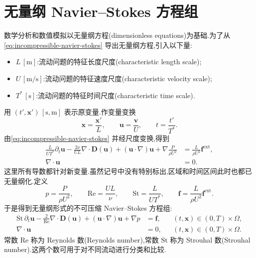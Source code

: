 \section{无量纲 Navier--Stokes 方程组}\label{sec:dimensionless-navier-stokes}
\markright{\thesection}

\begin{note}[特征尺度]\label{note:characteristic-scales}
数学分析和数值模拟以无量纲方程(dimensionless equations)为基础.为了从\cref{eq:incompressible-navier-stokes} 导出无量纲方程,引入以下量:
\begin{itemize}
  \item $L\,[\mathrm{m}]$:流动问题的特征长度尺度(characteristic length scale);
  \item $U\,[\mathrm{m}/\mathrm{s}]$:流动问题的特征速度尺度(characteristic velocity scale);
  \item $T^*\,[\mathrm{s}]$:流动问题的特征时间尺度(characteristic time scale).
\end{itemize}
\end{note}

\begin{note}\label{note:dimensionless-equations}
用 $(t',\bm{x}')\,[\mathrm{s},\mathrm{m}]$ 表示原变量.作变量变换
\begin{equation}\label{eq:dimensionless-variable-transform}
  \bm{x}=\frac{\bm{x}'}{L},\qquad
  \bm{u}=\frac{\bm{v}}{U},\qquad
  t=\frac{t'}{T^*}.
\end{equation}
由\cref{eq:incompressible-navier-stokes} 并经尺度变换,得到
\begin{equation*}
\begin{aligned}
  \frac{L}{UT^*}\partial_t\bm{u}
   -\frac{2\nu}{UL}\nabla\cdot\bm{D}(\bm{u})
   +(\bm{u}\cdot\nabla)\bm{u}
   +\nabla\frac{P}{\rho U^2}
  &=\frac{L}{\rho U^2}\bm{f}^{\mathrm{ext}},\\
  \nabla\cdot\bm{u}&=0.
\end{aligned}
\end{equation*}
这里所有导数都针对新变量.虽然记号中没有特别标出,区域和时间区间此时也都已无量纲化.定义
\begin{equation}\label{eq:dimensionless-parameters}
  p=\frac{P}{\rho U^2},\qquad
  \mathrm{Re}=\frac{UL}{\nu},\qquad
  \mathrm{St}=\frac{L}{UT^*},\qquad
  \bm{f}=\frac{L}{\rho U^2}\bm{f}^{\mathrm{ext}}.
\end{equation}
于是得到无量纲形式的不可压缩 Navier--Stokes 方程组:
\begin{equation}\label{eq:dimensionless-navier-stokes}
\begin{aligned}
  \mathrm{St}\,\partial_t\bm{u}
   -\frac{2}{\mathrm{Re}}\nabla\cdot\bm{D}(\bm{u})
   +(\bm{u}\cdot\nabla)\bm{u}+\nabla p
  &=\bm{f},
  &&(t,\bm{x})\in(0,T)\times\Omega,\\
  \nabla\cdot\bm{u}&=0,
  &&(t,\bm{x})\in(0,T)\times\Omega.
\end{aligned}
\end{equation}
常数 $\mathrm{Re}$ 称为 Reynolds 数(Reynolds number),常数 $\mathrm{St}$ 称为 Strouhal 数(Strouhal number).这两个数可用于对不同流动进行分类和比较.
\end{note}

